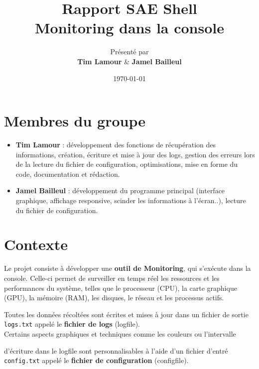 \documentclass{article}
\title{\Huge \textbf{Rapport SAE Shell} \\[0.5cm] \Large Monitoring dans la console}
\author{\large Présenté par\\ \textbf{Tim Lamour} \& \textbf{Jamel Bailleul}}
\date{\today}
\begin{document}
\maketitle %
\tableofcontents %
\newpage

\section{Membres du groupe}
\begin{itemize}
    \item \textbf{Tim Lamour} : développement des fonctions de récupération des informations, création, écriture et mise à jour des logs, gestion des erreurs lors de la lecture du fichier de configuration, optimisations, mise en forme du code, documentation et rédaction.
    \item \textbf{Jamel Bailleul} : développement du programme principal (interface graphique, affichage responsive, scinder les informations à l'écran..), lecture du fichier de configuration.

\end{itemize}

\section{Contexte}
Le projet consiste à développer une \textbf{outil de Monitoring}, qui s'exécute dans la console.
Celle-ci permet de surveiller en temps réel les ressources et les performances du système, telles que le processeur (CPU), la carte graphique (GPU), la mémoire (RAM), les disques, le réseau et les processus actifs.
\vspace{1em}

Toutes les données récoltées sont écrites et mises à jour dans un fichier de sortie \texttt{logs.txt} appelé le \textbf{fichier de logs} (logfile).
\\
Certains aspects graphiques et techniques comme les couleurs ou l'intervalle 
  
d'écriture dans le logfile sont personnalisables à l'aide d'un fichier d'entré \texttt{config.txt} appelé le \textbf{fichier de configuration} (configfile).

\end{document}
